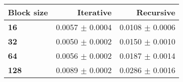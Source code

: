 \begin{tabular}{lrr}\toprule
\textbf{Block size}  & \textbf{Iterative} & \textbf{Recursive}\\\midrule
\textbf{16}  & 0.0057 $\pm$ 0.0004 & 0.0108 $\pm$ 0.0006\\
\textbf{32}  & 0.0050 $\pm$ 0.0002 & 0.0150 $\pm$ 0.0010\\
\textbf{64}  & 0.0056 $\pm$ 0.0002 & 0.0187 $\pm$ 0.0014\\
\textbf{128} & 0.0089 $\pm$ 0.0002 & 0.0286 $\pm$ 0.0016\\
\bottomrule
\end{tabular}
